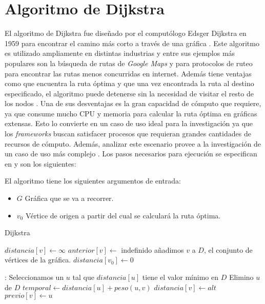 \section{Algoritmo de Dijkstra}


El algoritmo de Dijkstra fue diseñado por el computólogo Edsger Dijkstra en 1959 para encontrar el camino más corto a través de una gráfica \cite{dijkstraexplicado}. Este algoritmo es utilizado ampliamente en distintas industrias y entre sus ejemplos más populares son la búsqueda de rutas de \textit{Google Maps} y para protocolos de ruteo para encontrar las rutas menos concurridas en internet. Además tiene ventajas como que encuentra la ruta óptima y que una vez encontrada la ruta al destino especificado, el algoritmo puede detenerse sin la necesidad de visitar el resto de los nodos \cite{dijkstrabellford}. Una de sus desventajas es la gran capacidad de cómputo que requiere, ya que consume mucho CPU y memoria para calcular la ruta óptima en gráficas extensas. Esto lo convierte en un caso de uso ideal para la investigación ya que los \textit{frameworks} buscan satisfacer procesos que requieran grandes cantidades de recursos de cómputo. Además, analizar este escenario provee a la investigación de un caso de uso más complejo \cite{dijkstrabellford}. Los pasos necesarios para ejecución se especifican en \cite{dijkstrabellford} y son los siguientes:

El algoritmo tiene los siguientes argumentos de entrada:
\begin{itemize}
	\item $G$ Gráfica que se va a recorrer.
	\item $v_{0}$ Vértice de origen a partir del cual se calculará la ruta óptima.
\end{itemize}

\begin{algorithm}[H]
\caption{Dijkstra}\label{Dijkstra}
\begin{algorithmic}[1]
	\State $distancia[v] \gets \infty$
	\State $anterior[v] \gets $ indefinido
	\State añadimos $v$ a $D$, el conjunto de vértices de la gráfica.
\EndFor
\State $distancia[v_{0}] \gets 0$

:
	\State Seleccionamos un $u$ tal que $distancia[u]$ tiene el valor mínimo en $D$
	\State Elimino $u$ de $D$
		\State $temporal \gets distancia[u] + peso(u, v)$
			\State $distancia[v] \gets alt$
			\State $previo[v] \gets u$		
		\EndIf
	\EndFor
\EndWhile
\EndProcedure
\end{algorithmic}
\end{algorithm}

